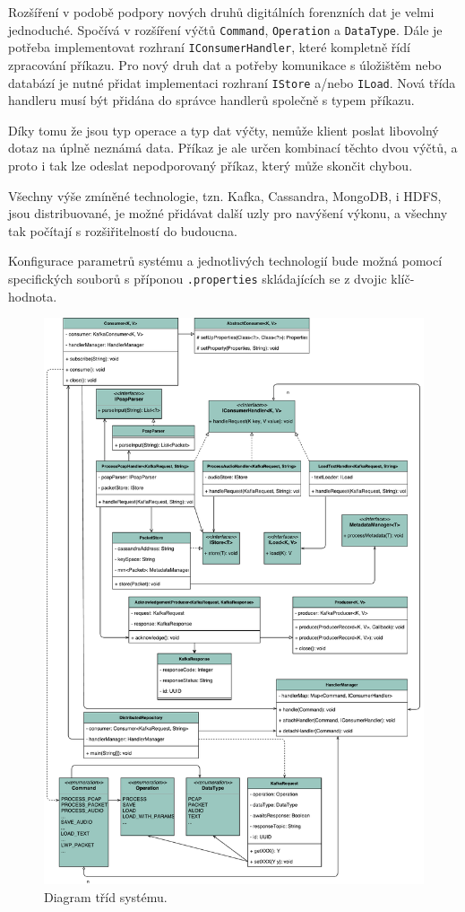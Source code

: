 Rozšíření v podobě podpory nových druhů digitálních forenzních dat je velmi jednoduché. Spočívá v rozšíření výčtů \texttt{Command}, \texttt{Operation} a \texttt{DataType}. Dále je potřeba implementovat rozhraní \texttt{IConsumerHandler}, které kompletně řídí zpracování příkazu.
Pro nový druh dat a potřeby komunikace s úložištěm nebo databází je nutné přidat implementaci rozhraní \texttt{IStore} a/nebo \texttt{ILoad}.
Nová třída handleru musí být přidána do správce handlerů společně s typem příkazu.

Díky tomu že jsou typ operace a typ dat výčty, nemůže klient poslat libovolný dotaz na úplně neznámá data. Příkaz je ale určen kombinací těchto dvou výčtů, a proto i tak lze odeslat nepodporovaný příkaz, který může skončit chybou.

Všechny výše zmíněné technologie, tzn. Kafka, Cassandra, MongoDB, i HDFS, jsou distribuované, je možné přidávat další uzly pro navýšení výkonu, a všechny tak počítají s rozšiřitelností do budoucna.

Konfigurace parametrů systému a jednotlivých technologií bude možná pomocí specifických souborů s příponou \texttt{.properties} skládajících se z dvojic klíč-hodnota.

\begin{figure}[!h]
  \centering
  \includegraphics[width=15cm]{template-fig/Prototype_ClassDiagram.pdf}
  \caption{Diagram tříd systému.}
  \label{FIG_SystemArchitecture}
\end{figure}

